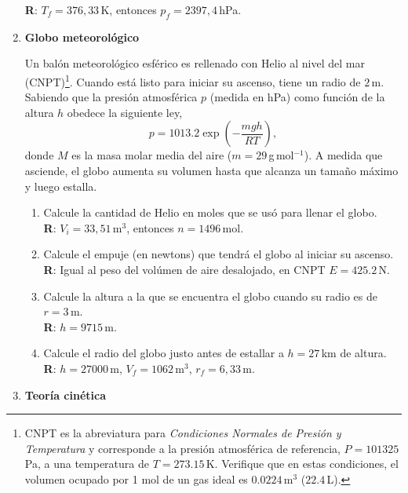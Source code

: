 \documentclass[a4paper,12pt]{article}
\begin{document}
\begin{enumerate}
		{\bf R}: $T_f = 376,33$\,K, entonces $p_f = 2397,4$\,hPa.
	\item {\bf{Globo meteorológico}}
		
		Un balón meteorológico esférico es rellenado con Helio al nivel del mar
		(CNPT)\footnote{CNPT es la abreviatura para {\textit{Condiciones
		Normales de Presión y Temperatura}} y corresponde a la presión
		atmosférica de referencia, $P=101325$\,Pa, a una temperatura de
		$T=273.15$\,K. Verifique que en estas condiciones, el volumen ocupado
		por 1 mol de un gas ideal es $0.0224$\,m$^3$ ($22.4$\,L).}.  Cuando
		está listo para iniciar su ascenso, tiene un radio de $2$\,m.  Sabiendo
		que la presión atmosférica $p$ (medida en hPa) como función de la
		altura $h$ obedece la siguiente ley, \[ p = 1013.2 \exp \left (
		-\frac{mgh}{RT} \right ),\] donde $M$ es la masa molar media del aire
		($m=29$\,g\,mol$^{-1}$). A medida que asciende, el globo aumenta su
		volumen hasta que alcanza un tamaño máximo y luego estalla. 
		\begin{enumerate}
			\item Calcule la cantidad de Helio en moles que se usó para llenar el globo.
				\\{\bf R}: $V_i=33,51$\,m$^3$, entonces $n=1496$\,mol.
			\item Calcule el empuje (en newtons) que tendrá el globo al iniciar su ascenso. 
				\\{\bf R}: Igual al peso del volúmen de aire desalojado, en CNPT $E=425.2$\,N.
			\item Calcule la altura a la que se encuentra el globo cuando su radio es de $r=3$\,m.
				\\{\bf R}: $h=9715$\,m.
			\item Calcule el radio del globo justo antes de estallar a $h=27$\,km de altura.
				\\{\bf R}: $h=27000$\,m, $V_f=1062$\,m$^3$, $r_f=6,33$\,m.
		\end{enumerate}

	\item {\bf{Teoría cinética}}


\end{enumerate}
\end{document}
